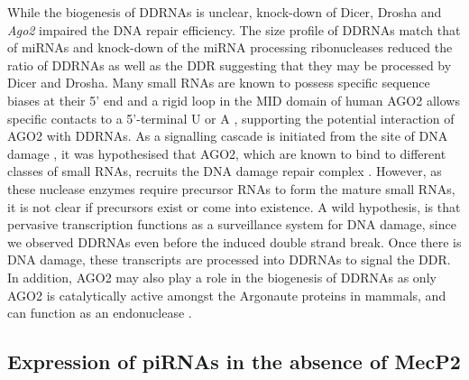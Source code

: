 While the biogenesis of DDRNAs is unclear, knock-down of Dicer, Drosha \citep{francia2012site} and \textit{Ago2} \citep{pmid22445173} impaired the DNA repair efficiency. The size profile of DDRNAs match that of miRNAs and knock-down of the miRNA processing ribonucleases reduced the ratio of DDRNAs as well as the DDR \citep{francia2012site} suggesting that they may be processed by Dicer and Drosha. Many small RNAs are known to possess specific sequence biases at their 5' end and a rigid loop in the MID domain of human AGO2 allows specific contacts to a 5'-terminal U or A \citep{pmid23732335}, supporting the potential interaction of AGO2 with DDRNAs. As a signalling cascade is initiated from the site of DNA damage \citep{pmid19847258}, it was hypothesised that AGO2, which are known to bind to different classes of small RNAs, recruits the DNA damage repair complex \citep{pmid22445173}. However, as these nuclease enzymes require precursor RNAs to form the mature small RNAs, it is not clear if precursors exist or come into existence. A wild hypothesis, is that pervasive transcription functions as a surveillance system for DNA damage, since we observed DDRNAs even before the induced double strand break. Once there is DNA damage, these transcripts are processed into DDRNAs to signal the DDR. In addition, AGO2 may also play a role in the biogenesis of DDRNAs as only AGO2 is catalytically active amongst the Argonaute proteins in mammals, and can function as an endonuclease \citep{pmid23732335}.

\subsection{Expression of piRNAs in the absence of MecP2}

